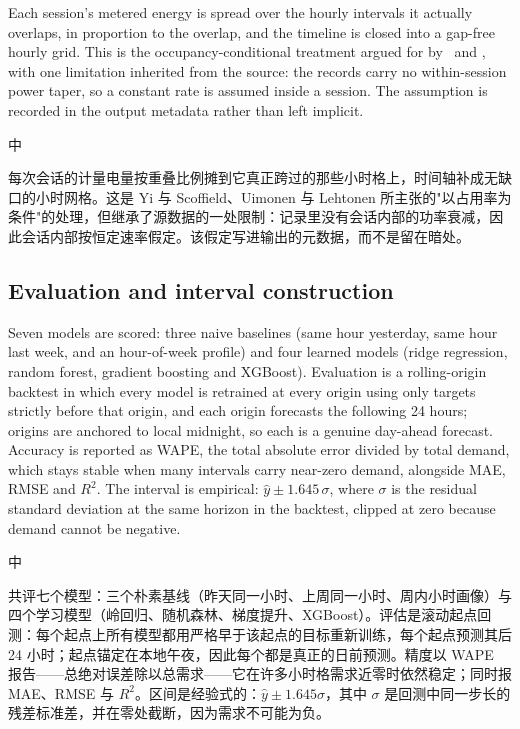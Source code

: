 \documentclass[10pt,a4paper]{article}
\newenvironment{zh}{%
  \par\vspace{1pt}%
  \begingroup
  \color{black!72}\small
  \setlength{\parskip}{0pt}%
  \noindent\textsf{\footnotesize 中}\hspace{3pt}\ignorespaces
}{%
  \par\endgroup\vspace{4pt}%
}
\begin{document}
Each session's metered energy is spread over the hourly intervals it actually overlaps, in
proportion to the overlap, and the timeline is closed into a gap-free hourly grid. This is the
occupancy-conditional treatment argued for by~\cite{Yi2018ResidentialLoadProfileGeneration} and
\cite{Uimonen2020OfficeBuildingOccupancy}, with one limitation inherited from the source: the
records carry no within-session power taper, so a constant rate is assumed inside a session. The
assumption is recorded in the output metadata rather than left implicit.

\begin{zh}
每次会话的计量电量按重叠比例摊到它真正跨过的那些小时格上，时间轴补成无缺口的小时网格。这是 Yi 与 Scoffield、Uimonen 与 Lehtonen 所主张的"以占用率为条件"的处理，但继承了源数据的一处限制：记录里没有会话内部的功率衰减，因此会话内部按恒定速率假定。该假定写进输出的元数据，而不是留在暗处。
\end{zh}

\subsection{Evaluation and interval construction}

Seven models are scored: three naive baselines (same hour yesterday, same hour last week, and an
hour-of-week profile) and four learned models (ridge regression, random forest, gradient boosting
and XGBoost). Evaluation is a rolling-origin backtest in which every model is retrained at every
origin using only targets strictly before that origin, and each origin forecasts the following
24 hours; origins are anchored to local midnight, so each is a genuine day-ahead forecast. Accuracy
is reported as WAPE, the total absolute error divided by total demand, which stays stable when many
intervals carry near-zero demand, alongside MAE, RMSE and $R^2$. The interval is empirical:
$\hat{y} \pm 1.645\,\sigma$, where $\sigma$ is the residual standard deviation at the same horizon
in the backtest, clipped at zero because demand cannot be negative.

\begin{zh}
共评七个模型：三个朴素基线（昨天同一小时、上周同一小时、周内小时画像）与四个学习模型（岭回归、随机森林、梯度提升、XGBoost）。评估是滚动起点回测：每个起点上所有模型都用严格早于该起点的目标重新训练，每个起点预测其后 24 小时；起点锚定在本地午夜，因此每个都是真正的日前预测。精度以 WAPE 报告——总绝对误差除以总需求——它在许多小时格需求近零时依然稳定；同时报 MAE、RMSE 与 $R^2$。区间是经验式的：$\hat{y} \pm 1.645\sigma$，其中 $\sigma$ 是回测中同一步长的残差标准差，并在零处截断，因为需求不可能为负。
\end{zh}
\end{document}
